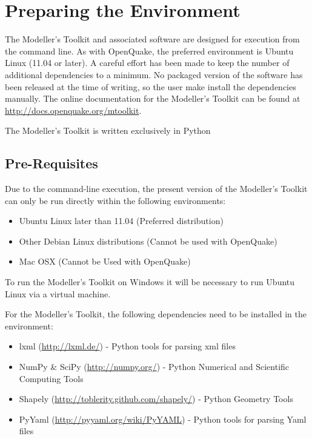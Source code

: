\section{Preparing the Environment}

The Modeller's Toolkit and associated software are designed for execution from the command line. As with OpenQuake, the preferred environment is Ubuntu Linux (11.04 or later). A careful effort has been made to keep the number of additional dependencies to a minimum. No packaged version of the software has been released at the time of writing, so the user make install the dependencies manually. The online documentation for the Modeller's Toolkit can be found at\\ \href{http://docs.openquake.org/mtoolkit}{http://docs.openquake.org/mtoolkit}.

The Modeller's Toolkit is written exclusively in Python

\subsection{Pre-Requisites}

Due to the command-line execution, the present version of the Modeller's Toolkit can only be run directly within the following environments:
\begin{itemize}

\item Ubuntu Linux later than 11.04 (Preferred distribution)

\item Other Debian Linux distributions (Cannot be used with OpenQuake)

\item Mac OSX (Cannot be Used with OpenQuake)

\end{itemize}

To run the Modeller's Toolkit on Windows it will be necessary to run Ubuntu Linux via a virtual machine.

For the Modeller's Toolkit, the following dependencies need to be installed in the environment:

\begin{itemize}

\item lxml (\href{http://lxml.de/}{http://lxml.de/})  - Python tools for parsing xml files

\item NumPy \& SciPy (\href{http://numpy.org/}{http://numpy.org/}) - Python Numerical and Scientific Computing Tools

\item Shapely (\href{http://toblerity.github.com/shapely/}{http://toblerity.github.com/shapely/}) - Python Geometry Tools

\item PyYaml (\href{http://pyyaml.org/wiki/PyYAML}{http://pyyaml.org/wiki/PyYAML}) - Python tools for parsing Yaml files

\end{itemize}

